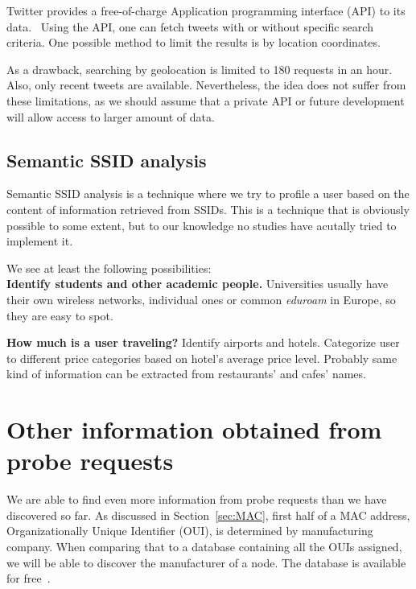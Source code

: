 \documentclass[12pt,a4paper,oneside,pdftex]{report}
\begin{document}
Twitter provides a free-of-charge Application programming interface (API) to its data.~\cite{twitterapi} Using the API, one can fetch tweets with or without specific search criteria. One possible method to limit the results is by location coordinates.

As a drawback, searching by geolocation is limited to 180 requests in an hour. Also, only recent tweets are available. Nevertheless, the idea does not suffer from these limitations, as we should assume that a private API or future development will allow access to larger amount of data.


\subsection{Semantic SSID analysis}

Semantic SSID analysis is a technique where we try to profile a user based on the content of information retrieved from SSIDs. This is a technique that is obviously possible to some extent, but to our knowledge no studies have acutally tried to implement it.

We see at least the following possibilities:\\

\textbf{Identify students and other academic people.} Universities usually have their own wireless networks, individual ones or common \emph{eduroam} in Europe, so they are easy to spot.

\textbf{How much is a user traveling?} Identify airports and hotels. Categorize user to different price categories based on hotel's average price level. Probably same kind of information can be extracted from restaurants' and cafes' names.

\textbf{}



\section{Other information obtained from probe requests}
\label{sec:other_info}

We are able to find even more information from probe requests than we have discovered so far. As discussed in Section~\ref{sec:MAC}, first half of a MAC address, Organizationally Unique Identifier (OUI), is determined by manufacturing company. When comparing that to a database containing all the OUIs assigned, we will be able to discover the manufacturer of a node. The database is available for free~\cite{oui_listing}.
\end{document}
